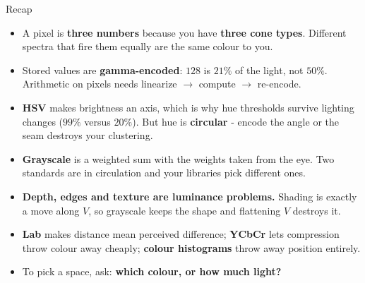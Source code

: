 \documentclass[aspectratio=169]{beamer}
\begin{document}
\begin{frame}{Recap}
  \begin{itemize}\small
    \item A pixel is \textbf{three numbers} because you have \textbf{three cone types}.
      Different spectra that fire them equally are the same colour to you.
    \item Stored values are \textbf{gamma-encoded}: $128$ is $21\%$ of the light, not
      $50\%$. Arithmetic on pixels needs linearize $\to$ compute $\to$ re-encode.
    \item \textbf{HSV} makes brightness an axis, which is why hue thresholds survive
      lighting changes ($99\%$ versus $20\%$). But hue is \textbf{circular} - encode the
      angle or the seam destroys your clustering.
    \item \textbf{Grayscale} is a weighted sum with the weights taken from the eye. Two
      standards are in circulation and your libraries pick different ones.
    \item \textbf{Depth, edges and texture are luminance problems.} Shading is exactly a
      move along $V$, so grayscale keeps the shape and flattening $V$ destroys it.
    \item \textbf{Lab} makes distance mean perceived difference; \textbf{YCbCr} lets
      compression throw colour away cheaply; \textbf{colour histograms} throw away
      position entirely.
    \item To pick a space, ask: \textbf{which colour, or how much light?}
  \end{itemize}
  \vfill
\end{frame}
\end{document}
